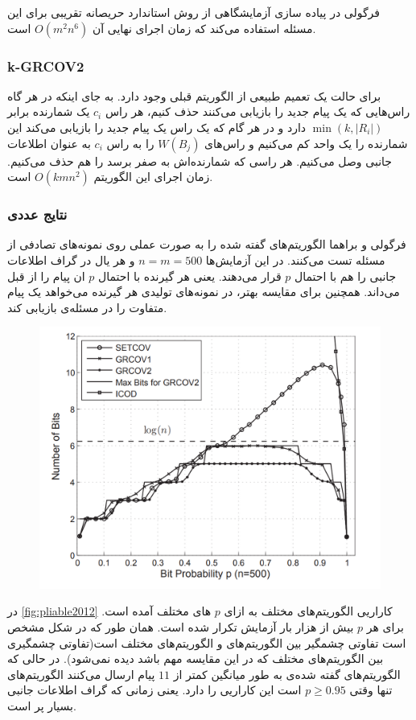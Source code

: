  فرگولی در پیاده سازی آزمایشگاهی از روش استاندارد حریصانه تقریبی برای این مسئله استفاده می‌کند که زمان اجرای نهایی آن
 $O(m^2 n^6)$
 است.
\subsubsection{k-GRCOV2}
برای حالت
\picodt
یک تعمیم طبیعی از الگوریتم قبلی وجود دارد. به جای اینکه در هر گاه راس‌هایی که یک پیام جدید را بازیابی می‌کنند حذف کنیم، هر راس 
$c_i$
یک شمارنده برابر
$\min(k, |R_i|)$
دارد و در هر گام که یک راس یک پیام جدید را بازیابی می‌کند این شمارنده را یک واحد کم می‌کنیم و راس‌های
$W(B_j)$
را به راس
$c_i$
به عنوان اطلاعات جانبی وصل می‌کنیم. هر راسی که شمارنده‌اش به صفر برسد را هم حذف می‌کنیم. زمان اجرای این الگوریتم
$O(kmn^2)$
است.

\subsubsection{
نتایج عددی
}
فرگولی و براهما  الگوریتم‌های گفته شده را به صورت عملی روی نمونه‌های تصادفی از مسئله تست می‌کنند. در این آزمایش‌ها 
$n = m = 500$
و هر یال در گراف اطلاعات جانبی را هم با احتمال
$p$
قرار می‌دهند. یعنی هر گیرنده با احتمال
$p$
ان پیام‌ را از قبل می‌داند. همچنین برای مقایسه بهتر، در نمونه‌های تولیدی هر گیرنده می‌خواهد یک پیام متفاوت را در مسئله‌ی
\icod
بازیابی کند.
\begin{figure}
	\centering
	\includegraphics[width=0.7\linewidth]{figs/ch3/pliable2012}
	\caption{\cite{pliablefirstpaper}}
	\label{fig:pliable2012}
\end{figure}

در 
\autoref{fig:pliable2012}
کاراریی الگوریتم‌های مختلف به ازای 
$p$
های مختلف آمده است. برای هر
$p$
بیش از هزار بار آزمایش تکرار شده است. همان طور که در شکل مشخص است تفاوتی چشمگیر بین الگوریتم‌های
\picod
و الگوریتم‌های مختلف
\icod
است(تفاوتی چشمگیری بین الگوریتم‌های مختلف
\icod
که در این مقایسه مهم باشد دیده نمی‌شود). در حالی که الگوریتم‌های گفته شده‌ی
\picod
به طور میانگین کمتر از
$11$
پیام ارسال می‌کنند الگوریتم‌های
\icod
تنها وقتی
$p \geq 0.95$
است این کاراریی را دارد. یعنی زمانی که گراف اطلاعات جانبی بسیار پر است.

